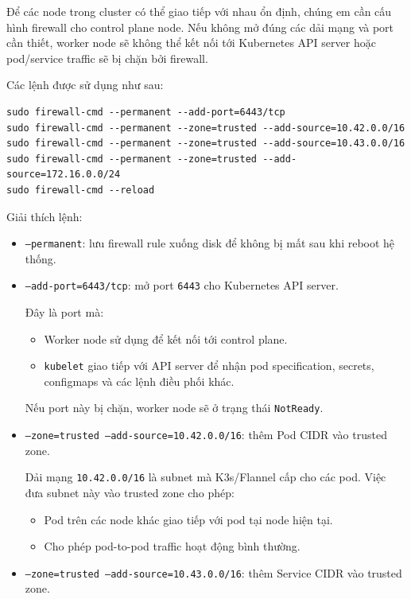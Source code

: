 Để các node trong cluster có thể giao tiếp với nhau ổn định, chúng em cần cấu hình firewall cho control plane node. Nếu không mở đúng các dải mạng và port cần thiết, worker node sẽ không thể kết nối tới Kubernetes API server hoặc pod/service traffic sẽ bị chặn bởi firewall.

Các lệnh được sử dụng như sau:

\begin{verbatim}
sudo firewall-cmd --permanent --add-port=6443/tcp
sudo firewall-cmd --permanent --zone=trusted --add-source=10.42.0.0/16
sudo firewall-cmd --permanent --zone=trusted --add-source=10.43.0.0/16
sudo firewall-cmd --permanent --zone=trusted --add-source=172.16.0.0/24
sudo firewall-cmd --reload
\end{verbatim}

Giải thích lệnh:
\begin{itemize}
    \item \texttt{--permanent}: lưu firewall rule xuống disk để không bị mất sau khi reboot hệ thống.
    
    \item \texttt{--add-port=6443/tcp}: mở port \texttt{6443} cho Kubernetes API server.
    
    Đây là port mà:
    \begin{itemize}
        \item Worker node sử dụng để kết nối tới control plane.
        \item \texttt{kubelet} giao tiếp với API server để nhận pod specification, secrets, configmaps và các lệnh điều phối khác.
    \end{itemize}
    
    Nếu port này bị chặn, worker node sẽ ở trạng thái \texttt{NotReady}.
    
    \item \texttt{--zone=trusted --add-source=10.42.0.0/16}: thêm Pod CIDR vào trusted zone.
    
    Dải mạng \texttt{10.42.0.0/16} là subnet mà K3s/Flannel cấp cho các pod. Việc đưa subnet này vào trusted zone cho phép:
    
    \begin{itemize}
        \item Pod trên các node khác giao tiếp với pod tại node hiện tại.
        \item Cho phép pod-to-pod traffic hoạt động bình thường.
    \end{itemize}
    
    \item \texttt{--zone=trusted --add-source=10.43.0.0/16}: thêm Service CIDR vào trusted zone.
    

\end{itemize}
